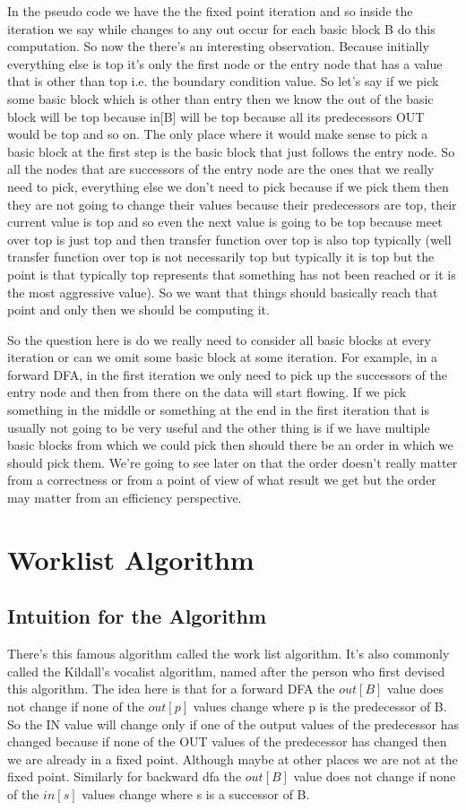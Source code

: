 In the pseudo code we have the the fixed point iteration and so inside the iteration we say while changes to any out occur for each basic block B do this computation. So now the there's an interesting observation. Because initially everything else is top it's only the first node or the entry node that has a value that is other than top i.e. the boundary condition value. So let's say if we pick some basic block which is other than entry then we know the out of the basic block will be top because in[B] will be top because all its predecessors OUT would be top and so on. The only place where it would make sense to pick a basic block at the first step is the basic block that just follows the entry node. So all the nodes that are successors of the entry node are the ones that we really need to pick, everything else we don't need to pick
because if we pick them then they are not going to change their values because their predecessors are top, their current value is top and so even the next value is going to be top because meet over top is just top and then transfer function over top is also top
typically (well transfer function over top is not necessarily top but typically it is top but the point is that typically top represents that something has not been reached or it is the most aggressive value). So we want that things should basically reach that point and only then we should be computing it. 

So the question here is do we really need to consider all basic blocks at every iteration or can we omit some basic block at some iteration. For example, in a forward DFA, in the first iteration we only need to pick up the successors of the entry node and then from there on the data will start flowing. If we pick something in the middle or something at the end in the first iteration that is usually not going to be very useful and the other thing is if we have multiple basic blocks from which we could pick then should there be an order in which we should pick them. We're going to see later on that the order doesn't really matter from a correctness or from a point of view of what result we get but the order may matter from an efficiency perspective.

\section{Worklist Algorithm}
\subsection{Intuition for the Algorithm}
There's this famous algorithm called the work list algorithm. It's also commonly called the Kildall's vocalist algorithm, named after the person who first devised this algorithm. The idea here is that for a forward DFA the $out[B]$ value does not change
if none of the $out[p]$ values change where p is the predecessor of B. So the IN value will change only if one of the output values of the predecessor has changed because if none of the OUT values of the predecessor has changed then we are already in a fixed point. Although maybe at other places we are not at the fixed point. Similarly for
backward dfa the $out[B]$ value does not change if none of the $in[s]$ values change where s is a successor of B.

